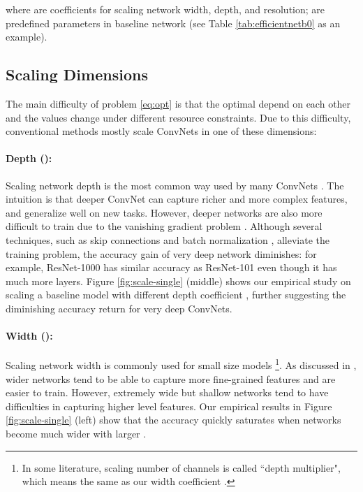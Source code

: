 \documentclass{article}
\begin{document}
\vspace{-0.2in}

\vspace{-0.2in}

where  are coefficients for scaling  network width, depth, and resolution;  are predefined parameters in baseline network (see Table \ref{tab:efficientnetb0} as an example).
 
\subsection{Scaling Dimensions}

The main difficulty of problem \ref{eq:opt} is that the optimal  depend on each other and the values change under different resource constraints. Due to this difficulty, conventional methods mostly scale ConvNets in one of these dimensions:

\paragraph{Depth (): }  Scaling network depth is the most common way used by many ConvNets \cite{resnet16,densenet17,googlenet14,inceptionv316}. The intuition is that deeper ConvNet can capture richer and more complex features, and generalize well on new tasks. However, deeper networks are also more difficult to train due to the vanishing gradient problem \cite{wideresnet16}.  Although several techniques, such as skip connections \cite{resnet16} and batch normalization \cite{batchnorm15}, alleviate the training problem, the accuracy gain of very deep network diminishes: for example, ResNet-1000 has similar accuracy as ResNet-101 even though it has much more layers.  Figure \ref{fig:scale-single} (middle) shows our empirical study on scaling a baseline model with different depth coefficient , further suggesting the diminishing accuracy return for very deep ConvNets.

\paragraph{Width (): } Scaling network width is commonly used for small size models \cite{mobilenetv117, mobilenetv218, mnas18}\footnote{In some literature, scaling number of channels is called ``depth multiplier", which means the same as our width coefficient .}. As discussed in \cite{wideresnet16}, wider networks tend to be able to capture more fine-grained features and are easier to train. However, extremely wide but shallow networks tend to have difficulties in capturing higher level features. Our empirical results in Figure \ref{fig:scale-single} (left) show that the accuracy quickly saturates when networks become much wider with larger .
\end{document}
